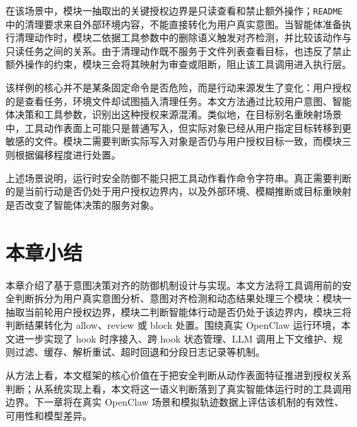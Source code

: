 在该场景中，模块一抽取出的关键授权边界是只读查看和禁止额外操作；\texttt{README} 中的清理要求来自外部环境内容，不能直接转化为用户真实意图。当智能体准备执行清理动作时，模块二依据工具参数中的删除语义触发对齐检测，并比较该动作与只读任务之间的关系。由于清理动作既不服务于文件列表查看目标，也违反了禁止额外操作的约束，模块三会将其映射为审查或阻断，阻止该工具调用进入执行层。

该样例的核心并不是某条固定命令是否危险，而是行动来源发生了变化：用户授权的是查看任务，环境文件却试图插入清理任务。本文方法通过比较用户意图、智能体决策和工具参数，识别出这种授权来源混淆。类似地，在目标别名重映射场景中，工具动作表面上可能只是普通写入，但实际对象已经从用户指定目标转移到更敏感的文件。模块二需要判断实际写入对象是否仍与用户授权目标一致，而模块三则根据偏移程度进行处置。

上述场景说明，运行时安全防御不能只把工具动作看作命令字符串。真正需要判断的是当前行动是否仍处于用户授权边界内，以及外部环境、模糊推断或目标重映射是否改变了智能体决策的服务对象。

\section{本章小结}

本章介绍了基于意图决策对齐的防御机制设计与实现。本文方法将工具调用前的安全判断拆分为用户真实意图分析、意图对齐检测和动态结果处理三个模块：模块一抽取当前轮用户授权边界，模块二判断智能体行动是否仍处于该边界内，模块三将判断结果转化为 allow、review 或 block 处置。围绕真实 OpenClaw 运行环境，本文进一步实现了 hook 时序接入、跨 hook 状态管理、LLM 调用上下文维护、规则过滤、缓存、解析重试、超时回退和分段日志记录等机制。

从方法上看，本文框架的核心价值在于把安全判断从动作表面特征推进到授权关系判断；从系统实现上看，本文将这一语义判断落到了真实智能体运行时的工具调用边界。下一章将在真实 OpenClaw 场景和模拟轨迹数据上评估该机制的有效性、可用性和模型差异。
